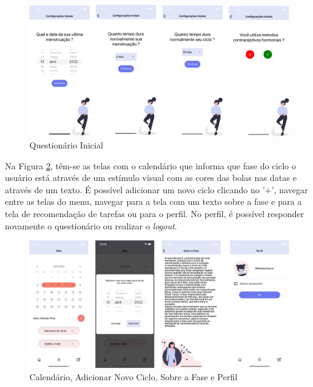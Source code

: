 \begin{figure}[htbp]
	\caption{Questionário Inicial}
	\begin{center}
	\includegraphics[keepaspectratio=true,scale=0.08]{figuras/aplicativo4.png}
	\end{center}
    \label{fig20}
\end{figure}

Na Figura \ref{fig21}, têm-se as telas com o calendário que informa que fase do ciclo o usuário está através 
de um estímulo visual com as cores das bolas nas datas e através de um texto. É possível adicionar um novo ciclo 
clicando no '+', navegar entre as telas do menu, navegar para a tela com um texto sobre a fase e para a tela 
de recomendação de tarefas ou para o perfil. No perfil, é possível responder novamente o questionário ou 
realizar o \emph{logout}.

\begin{figure}[htbp]
	\caption{Calendário, Adicionar Novo Ciclo, Sobre a Fase e Perfil}
	\begin{center}
	\includegraphics[keepaspectratio=true,scale=0.08]{figuras/aplicativo2.png}
	\end{center}
    \label{fig21}
\end{figure}


